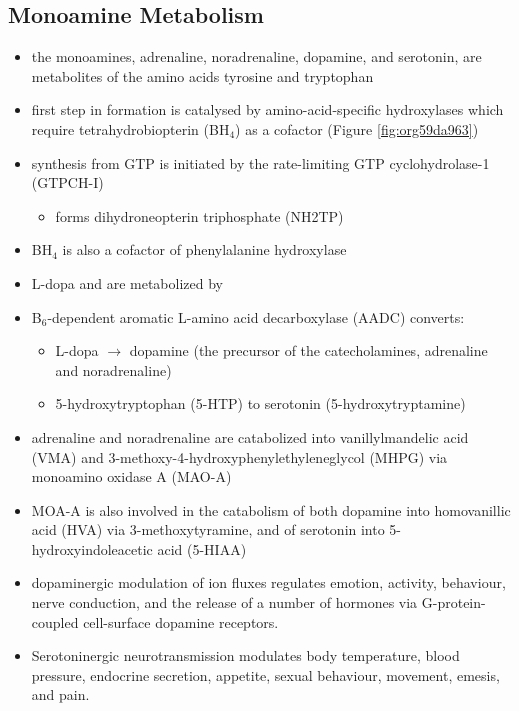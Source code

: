 \documentclass{scrartcl}
\begin{document}
\subsection{Monoamine Metabolism}
\label{sec:orgd3934ae}
\begin{itemize}
\item the monoamines, adrenaline, noradrenaline, dopamine, and serotonin,
are metabolites of the amino acids tyrosine and tryptophan
\item first step in formation is catalysed by amino-acid-specific
hydroxylases which require tetrahydrobiopterin (BH\(_{\text{4}}\)) as a cofactor
(Figure \ref{fig:org59da963})
\item synthesis from GTP is initiated by the rate-limiting GTP
cyclohydrolase-1 (GTPCH-I)
\begin{itemize}
\item forms dihydroneopterin triphosphate (NH2TP)
\end{itemize}
\item BH\(_{\text{4}}\) is also a cofactor of phenylalanine hydroxylase
\item L-dopa and  are metabolized by
\item B\(_{\text{6}}\)-dependent aromatic L-amino acid decarboxylase (AADC) converts:
\begin{itemize}
\item L-dopa \(\to\) dopamine (the precursor of the catecholamines, adrenaline and
noradrenaline)
\item 5-hydroxytryptophan (5-HTP) to serotonin (5-hydroxytryptamine)
\end{itemize}
\item adrenaline and noradrenaline are catabolized into vanillylmandelic
acid (VMA) and 3-methoxy-4-hydroxyphenylethyleneglycol (MHPG) via
monoamino oxidase A (MAO-A)
\item MOA-A is also involved in the catabolism of both dopamine into
homovanillic acid (HVA) via 3-methoxytyramine, and of serotonin into
5-hydroxyindoleacetic acid (5-HIAA)
\item dopaminergic modulation of ion fluxes regulates emotion, activity,
behaviour, nerve conduction, and the release of a number of hormones
via G-protein-coupled cell-surface dopamine
receptors.
\item Serotoninergic neurotransmission modulates body temperature, blood
pressure, endocrine secretion, appetite, sexual behaviour, movement,
emesis, and pain.
\end{itemize}
\end{document}
